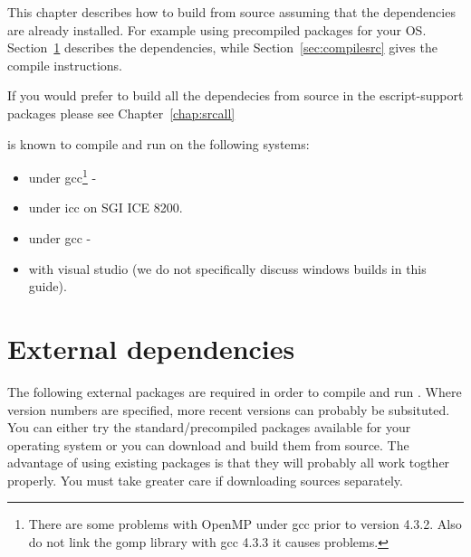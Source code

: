 
%
%
%



This chapter describes how to build \escript from source assuming that the dependencies are already installed.
For example using precompiled packages for your OS.
Section~\ref{sec:deps} describes the dependencies, while Section~\ref{sec:compilesrc} gives the compile instructions.

If you would prefer to build all the dependecies from source in the escript-support packages please see Chapter~\ref{chap:srcall}

\esfinley is known to compile and run on the following systems:
\begin{itemize}
 \item \linux under gcc\footnote{There are some problems with OpenMP under gcc prior to version 4.3.2. Also do not link the gomp library with gcc 4.3.3 it causes problems.} - 
\item \linux under icc on SGI ICE 8200.
\item \macosx under gcc - 
\item \winxp with visual studio (we do not specifically discuss windows builds in this guide).
\end{itemize}

\section{External dependencies}
\label{sec:deps}
The following external packages are required in order to compile and run \esfinley.
Where version numbers are specified, more recent versions can probably be subsituted.
You can either try the standard/precompiled packages available for your operating system or you can download and build them from source.
The advantage of using existing packages is that they will probably all work togther properly.
You must take greater care if downloading sources separately.

